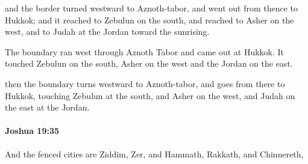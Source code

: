 			\begin{versebox}
					\item[BHS] 
					\item[ASV] and the border turned westward to Aznoth-tabor, and went out from thence to Hukkok; and it reached to Zebulun on the south, and reached to Asher on the west, and to Judah at the Jordan toward the sunrising.
					\item[NIV] The boundary ran west through Aznoth Tabor and came out at Hukkok. It touched Zebulun on the south, Asher on the west and the Jordan on the east.
					\item[NRSV] then the boundary turns westward to Aznoth-tabor, and goes from there to Hukkok, touching Zebulun at the south, and Asher on the west, and Judah on the east at the Jordan.
			\end{versebox}

		\paragraph{Joshua 19:35} %
			\label{JOSHUA-19-35}

			And the fenced cities are Ziddim, Zer, and Hammath, Rakkath, and Chinnereth,

